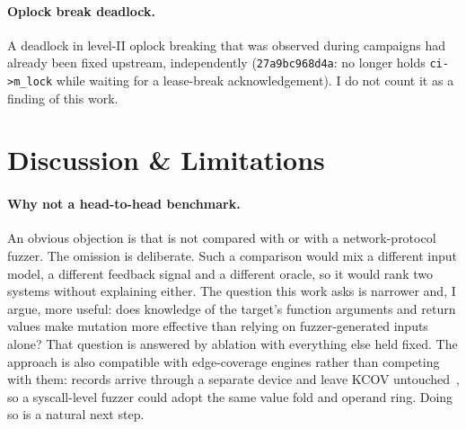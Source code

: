 \documentclass{article}
\begin{document}
\paragraph{Oplock break deadlock.} A deadlock in level-II oplock breaking that
was observed during campaigns had already been fixed upstream, independently
(\texttt{27a9bc968d4a}: \ksmbd no longer holds \texttt{ci->m\_lock} while
waiting for a lease-break acknowledgement). I do not count it as a finding of
this work.


\section{Discussion \& Limitations}\label{sec:discussion}

\paragraph{Why not a head-to-head benchmark.} An obvious objection is that
\toolname is not compared with \syzkaller or with a network-protocol fuzzer.
The omission is deliberate. Such a comparison would mix a different input
model, a different feedback signal and a different oracle, so it would rank
two systems without explaining either. The question this work asks is
narrower and, I argue, more useful: does knowledge of the target's function
arguments and return values make mutation more effective than relying on
fuzzer-generated inputs alone? That question is answered by ablation with
everything else held fixed. The approach is also compatible with edge-coverage
engines rather than competing with them: \kcovdf records arrive through a
separate device and leave KCOV untouched~\cite{kim2026kcovdataflow}, so a
syscall-level fuzzer could adopt the same value fold and operand ring. Doing
so is a natural next step.
\end{document}
